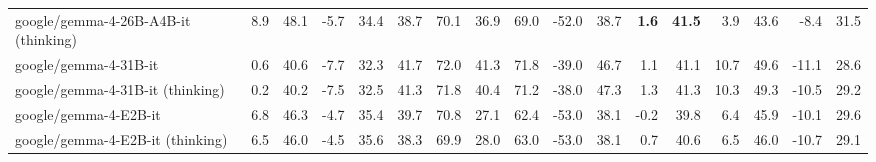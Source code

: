 \documentclass{article}
\begin{document}
\begin{table}[htbp]
\begin{threeparttable}
\begin{adjustbox}{max width=\textwidth}
\begin{tabular}{lrrrrrrrrrrrrrrrr}
google/gemma-4-26B-A4B-it (thinking) & \cellcolor[HTML]{FAD6C7}8.9 & \cellcolor[HTML]{FADDD0}48.1 & \cellcolor[HTML]{F5AD8D}-5.7 & \cellcolor[HTML]{F5AF90}34.4 & \cellcolor[HTML]{FDF0EA}38.7 & \cellcolor[HTML]{FEFCFA}70.1 & \cellcolor[HTML]{F8CBB8}36.9 & \cellcolor[HTML]{F9D5C5}69.0 & \cellcolor[HTML]{F7BEA5}-52.0 & \cellcolor[HTML]{F7C1A9}38.7 & \cellcolor[HTML]{92C5DE}\textbf{1.6} & \cellcolor[HTML]{92C5DE}\textbf{41.5} & \cellcolor[HTML]{F5B497}3.9 & \cellcolor[HTML]{F6BBA1}43.6 & \cellcolor[HTML]{F5AD8D}-8.4 & \cellcolor[HTML]{F5B193}31.5 \\
google/gemma-4-31B-it & \cellcolor[HTML]{F4A785}0.6 & \cellcolor[HTML]{F4A785}40.6 & \cellcolor[HTML]{F4A582}-7.7 & \cellcolor[HTML]{F4A582}32.3 & \cellcolor[HTML]{FEFAF8}41.7 & \cellcolor[HTML]{F6FAFC}72.0 & \cellcolor[HTML]{FAD8C8}41.3 & \cellcolor[HTML]{FBE3D9}71.8 & \cellcolor[HTML]{E7F2F7}-39.0 & \cellcolor[HTML]{E2EFF6}46.7 & \cellcolor[HTML]{9FCCE2}1.1 & \cellcolor[HTML]{9FCBE1}41.1 & \cellcolor[HTML]{F7C1A9}10.7 & \cellcolor[HTML]{F8CDBA}49.6 & \cellcolor[HTML]{F4A886}-11.1 & \cellcolor[HTML]{F4A988}28.6 \\
google/gemma-4-31B-it (thinking) & \cellcolor[HTML]{F4A582}0.2 & \cellcolor[HTML]{F4A582}40.2 & \cellcolor[HTML]{F4A582}-7.5 & \cellcolor[HTML]{F4A583}32.5 & \cellcolor[HTML]{FEF9F7}41.3 & \cellcolor[HTML]{F7FBFC}71.8 & \cellcolor[HTML]{F9D5C5}40.4 & \cellcolor[HTML]{FBE0D5}71.2 & \cellcolor[HTML]{DFEEF5}-38.0 & \cellcolor[HTML]{DAEBF3}47.3 & \cellcolor[HTML]{98C8E0}1.3 & \cellcolor[HTML]{98C8DF}41.3 & \cellcolor[HTML]{F7C0A8}10.3 & \cellcolor[HTML]{F8CCB9}49.3 & \cellcolor[HTML]{F4A987}-10.5 & \cellcolor[HTML]{F4AB8B}29.2 \\
google/gemma-4-E2B-it & \cellcolor[HTML]{F8CAB6}6.8 & \cellcolor[HTML]{F9D0BD}46.3 & \cellcolor[HTML]{F5B193}-4.7 & \cellcolor[HTML]{F5B497}35.4 & \cellcolor[HTML]{FDF3EF}39.7 & \cellcolor[HTML]{FEFEFE}70.8 & \cellcolor[HTML]{F5B192}27.1 & \cellcolor[HTML]{F5B598}62.4 & \cellcolor[HTML]{F6B89C}-53.0 & \cellcolor[HTML]{F6BA9F}38.1 & \cellcolor[HTML]{C8E2EE}-0.2 & \cellcolor[HTML]{C6E1ED}39.8 & \cellcolor[HTML]{F6B99D}6.4 & \cellcolor[HTML]{F7C2AB}45.9 & \cellcolor[HTML]{F4A988}-10.1 & \cellcolor[HTML]{F4AC8C}29.6 \\
google/gemma-4-E2B-it (thinking) & \cellcolor[HTML]{F8C9B4}6.5 & \cellcolor[HTML]{F9CEBB}46.0 & \cellcolor[HTML]{F5B294}-4.5 & \cellcolor[HTML]{F6B598}35.6 & \cellcolor[HTML]{FDEFE9}38.3 & \cellcolor[HTML]{FEFAF9}69.9 & \cellcolor[HTML]{F5B396}28.0 & \cellcolor[HTML]{F6B89C}63.0 & \cellcolor[HTML]{F6B89C}-53.0 & \cellcolor[HTML]{F6BA9F}38.1 & \cellcolor[HTML]{ADD3E6}0.7 & \cellcolor[HTML]{ACD2E5}40.6 & \cellcolor[HTML]{F6B99E}6.5 & \cellcolor[HTML]{F7C2AB}46.0 & \cellcolor[HTML]{F4A887}-10.7 & \cellcolor[HTML]{F4AB8A}29.1 \\

\end{tabular}
\end{adjustbox}
\end{threeparttable}
\end{table}
\end{document}
